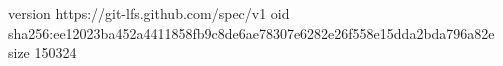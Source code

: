 version https://git-lfs.github.com/spec/v1
oid sha256:ee12023ba452a4411858fb9c8de6ae78307e6282e26f558e15dda2bda796a82e
size 150324
